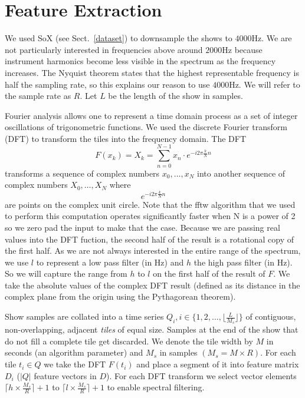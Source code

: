 \documentclass[twocolumn]{article}
\begin{document}
\section{Feature Extraction}\label{feat_ex} %

We used SoX (see Sect.~\ref{dataset}) to downsample the shows to $4000$Hz. We are not particularly interested in frequencies above around $2000$Hz because instrument harmonics become less visible in the spectrum as the frequency increases. The Nyquist theorem \cite{nyquist1928certain} states that the highest representable frequency is half the sampling rate, so this explains our reason to use $4000$Hz. We will refer to the sample rate as $R$. Let $L$ be the length of the show in samples.

Fourier analysis allows one to represent a time domain process as a set of integer oscillations of trigonometric functions. We used the discrete Fourier transform (DFT) to transform the tiles into the frequency domain. The DFT 
$$F(x_k) = X_k = \sum_{n=0}^{N-1} x_n \cdot e^{-i 2 \pi \frac{k}{N} n}$$ transforms a sequence of complex numbers $x_0,\ldots,x_N$ into another sequence of complex numbers $X_0,\ldots,X_N$ where $$e^{-i 2 \pi \frac{k}{N} n}$$ are points on the complex unit circle. Note that the fftw algorithm \cite{frigo2004fftw} that we used to perform this computation operates significantly faster when N is a power of 2 so we zero pad the input to make that the case. Because we are passing real values into the DFT fuction, the second half of the result is a rotational copy of the first half. As we are not always interested in the entire range of the spectrum, we use $l$ to represent a low pass filter (in Hz) and $h$ the high pass filter (in Hz). So we will capture the range from $h$ to $l$ on the first half of the result of $F$. We take the absolute values of the complex DFT result (defined as its distance in the complex plane from the origin using the Pythagorean theorem).

Show samples are collated into a time series $Q_i, i \in \{1,2,\ldots,\lfloor\frac{L}{M_s}\rfloor\} $ of contiguous, non-overlapping, adjacent \emph{tiles} of equal size. Samples at the end of the show that do not fill a complete tile get discarded. We denote the tile width by $M$ in seconds (an algorithm parameter) and $M_s$ in samples $(M_s = M \times R)$. For each tile $t_i \in Q$ we take the DFT $F(t_i)$ and place a segment of it into feature matrix $D_i$ ($|Q|$ feature vectors in $D$). For each DFT transform we select vector elements $\lceil h \times \frac{M_s}{R} \rceil+1$ to $\lceil l \times \frac{M_s}{R} \rceil+1$ to enable spectral filtering.
\end{document}
